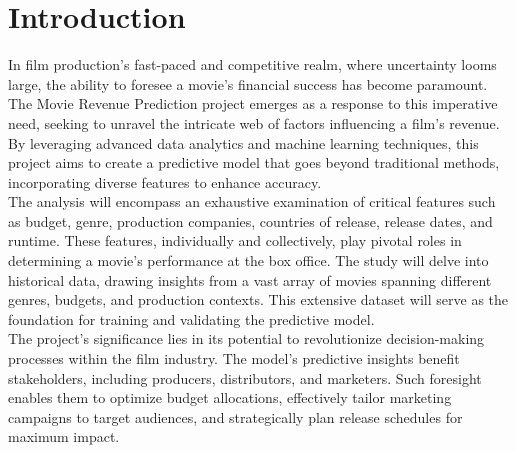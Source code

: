 \documentclass[conference]{IEEEtran}
\begin{document}
\section{Introduction}
In film production's fast-paced and competitive realm, where uncertainty looms large, the ability to foresee a movie's financial success has become paramount. The Movie Revenue Prediction project emerges as a response to this imperative need, seeking to unravel the intricate web of factors influencing a film's revenue. By leveraging advanced data analytics and machine learning techniques, this project aims to create a predictive model that goes beyond traditional methods, incorporating diverse features to enhance accuracy.\\
The analysis will encompass an exhaustive examination of critical features such as budget, genre, production companies, countries of release, release dates, and runtime. These features, individually and collectively, play pivotal roles in determining a movie's performance at the box office. The study will delve into historical data, drawing insights from a vast array of movies spanning different genres, budgets, and production contexts. This extensive dataset will serve as the foundation for training and validating the predictive model.\\

The project's significance lies in its potential to revolutionize decision-making processes within the film industry. The model's predictive insights benefit stakeholders, including producers, distributors, and marketers. Such foresight enables them to optimize budget allocations, effectively tailor marketing campaigns to target audiences, and strategically plan release schedules for maximum impact.\\
\end{document}
